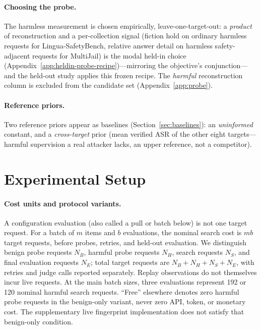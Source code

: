 \documentclass{article}
\begin{document}
\paragraph{Choosing the probe.} The harmless measurement is chosen empirically, leave-one-target-out: a \emph{product} of reconstruction and a per-collection signal (fiction hold on ordinary harmless requests for Lingua-SafetyBench, relative answer detail on harmless safety-adjacent requests for MultiJail) is the modal held-in choice (Appendix~\ref{app:heldin-probe-recipe})---mirroring the objective's conjunction---and the held-out study applies this frozen recipe. The \emph{harmful} reconstruction column is excluded from the candidate set (Appendix~\ref{app:probe}).

\paragraph{Reference priors.} Two reference priors appear as baselines (Section~\ref{sec:baselines}): an \emph{uninformed} constant, and a \emph{cross-target} prior (mean verified ASR of the other eight targets---harmful supervision a real attacker lacks, an upper reference, not a competitor).

\section{Experimental Setup}
\label{sec:exp}
\paragraph{Cost units and protocol variants.} A configuration evaluation (also called a pull or batch below) is not one target request. For a batch of $m$ items and $b$ evaluations, the nominal search cost is $mb$ target requests, before probes, retries, and held-out evaluation. We distinguish benign probe requests $N_B$, harmful probe requests $N_H$, search requests $N_S$, and final evaluation requests $N_E$; total target requests are $N_B+N_H+N_S+N_E$, with retries and judge calls reported separately. Replay observations do not themselves incur live requests. At the main batch sizes, three evaluations represent 192 or 120 nominal harmful search requests. ``Free'' elsewhere denotes zero harmful probe requests in the benign-only variant, never zero API, token, or monetary cost. The supplementary live fingerprint implementation does not satisfy that benign-only condition.
\end{document}
